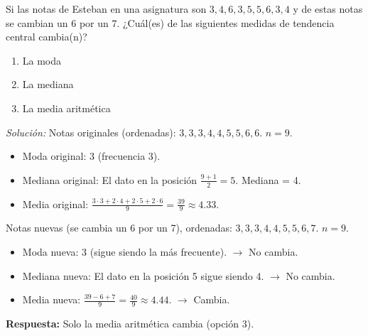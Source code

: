 \documentclass[12pt, letterpaper]{article}
\begin{document}
\noindent
Si las notas de Esteban en una asignatura son \(3, 4, 6, 3, 5, 5, 6, 3, 4\) y de estas notas se cambian un $6$ por un $7$. ¿Cuál(es) de las siguientes medidas de tendencia central cambia(n)?
\begin{enumerate}
	\item La moda
	\item La mediana
	\item La media aritmética
\end{enumerate}
\textit{Solución:}
Notas originales (ordenadas): \(3, 3, 3, 4, 4, 5, 5, 6, 6\). $n=9$.
\begin{itemize}
	\item Moda original: 3 (frecuencia 3).
	\item Mediana original: El dato en la posición $\frac{9+1}{2}=5$. Mediana = 4.
	\item Media original: $\frac{3 \cdot 3 + 2 \cdot 4 + 2 \cdot 5 + 2 \cdot 6}{9} = \frac{39}{9} \approx 4.33$.
\end{itemize}
Notas nuevas (se cambia un 6 por un 7), ordenadas: \(3, 3, 3, 4, 4, 5, 5, 6, 7\). $n=9$.
\begin{itemize}
	\item Moda nueva: 3 (sigue siendo la más frecuente). $\rightarrow$ No cambia.
	\item Mediana nueva: El dato en la posición 5 sigue siendo 4. $\rightarrow$ No cambia.
	\item Media nueva: $\frac{39 - 6 + 7}{9} = \frac{40}{9} \approx 4.44$. $\rightarrow$ Cambia.
\end{itemize}
\textbf{Respuesta:} Solo la media aritmética cambia (opción 3).
\end{document}

